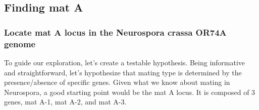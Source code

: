 \documentclass[
  letterpaper,
  DIV=11,
  numbers=noendperiod]{scrreprt}
\begin{document}
\subsection*{Finding mat A}\label{finding-mat-a}

\subsubsection*{Locate mat A locus in the Neurospora crassa OR74A
genome}\label{locate-mat-a-locus-in-the-neurospora-crassa-or74a-genome}

To guide our exploration, let's create a testable hypothesis. Being
informative and straightforward, let's hypothesize that mating type is
determined by the presence/absence of specific genes. Given what we know
about mating in Neurospora, a good starting point would be the mat A
locus. It is composed of 3 genes, mat A-1, mat A-2, and mat A-3.
\end{document}
